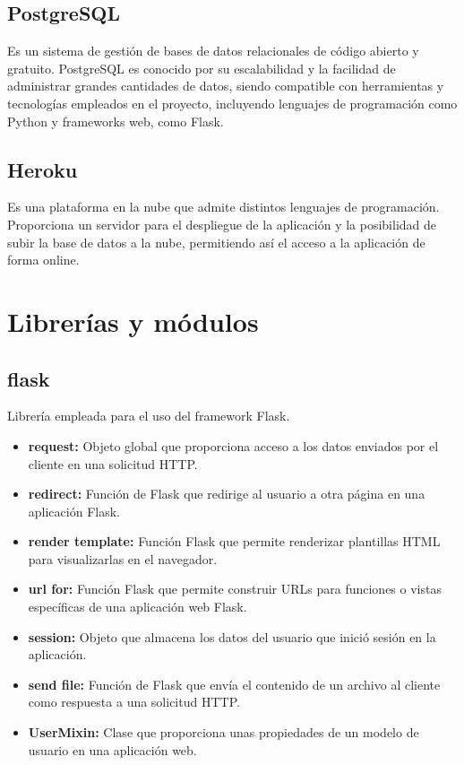 \subsection{PostgreSQL} 
\cite{PostgreSQL_bib} Es un sistema de gestión de bases de datos relacionales de código abierto y gratuito.
PostgreSQL es conocido por su escalabilidad y la facilidad de administrar grandes cantidades de datos, siendo compatible con herramientas y tecnologías empleados en el proyecto, incluyendo lenguajes de programación como Python y frameworks web, como Flask.

\subsection{Heroku} 
\cite{heroku_bib} Es una plataforma en la nube que admite distintos lenguajes de programación. Proporciona un servidor para el despliegue de la aplicación y la posibilidad de subir la base de datos a la nube, permitiendo así el acceso a la aplicación de forma online.

\section{Librerías y módulos}
\subsection{flask}
Librería empleada para el uso del framework Flask.
\begin{itemize}
    \item \textbf{request:} \cite{request} Objeto global que proporciona acceso a los datos enviados por el cliente en una solicitud HTTP.
    \item \textbf{redirect:} \cite{redirect} Función de Flask que redirige al usuario a otra página en una aplicación Flask.
    \item \textbf{render template:}
\cite{render_template} Función Flask que permite renderizar plantillas HTML para visualizarlas en el navegador.
    \item \textbf{url for:} \cite{url} Función Flask que permite construir URLs para funciones o vistas específicas de una aplicación web Flask.
    \item \textbf{session:} \cite{session} Objeto que almacena los datos del usuario que inició sesión en la aplicación.
    \item \textbf{send file:} \cite{send_file} Función de Flask que envía el contenido de un archivo al cliente como respuesta a una solicitud HTTP.
    \item \textbf{UserMixin:} \cite{UserMixin} Clase que proporciona unas propiedades de un modelo de usuario en una aplicación web.
\end{itemize}

